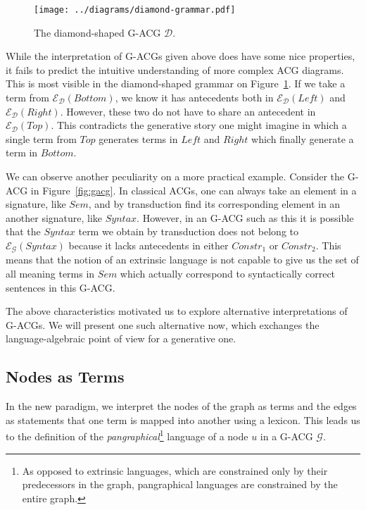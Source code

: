 \documentclass{llncs}
\begin{document}
\begin{figure}
  \centering
  \texttt{[image: ../diagrams/diamond-grammar.pdf]}
  \caption{\label{fig:diamond} The diamond-shaped G-ACG $\mathcal{D}$.}
\end{figure}

While the interpretation of G-ACGs given above does have some nice properties,
it fails to predict the intuitive understanding of more complex ACG
diagrams. This is most visible in the diamond-shaped grammar on
Figure~\ref{fig:diamond}. If we take a term from
$\mathcal{E}_{\mathcal{D}}(Bottom)$, we know it has antecedents both in
$\mathcal{E}_{\mathcal{D}}(Left)$ and
$\mathcal{E}_{\mathcal{D}}(Right)$. However, these two do not have to share an
antecedent in $\mathcal{E}_{\mathcal{D}}(Top)$. This contradicts the
generative story one might imagine in which a single term from $Top$ generates
terms in $Left$ and $Right$ which finally generate a term in $Bottom$.

We can observe another peculiarity on a more practical example. Consider the
G-ACG in Figure~\ref{fig:gacg}. In classical ACGs, one can always take an
element in a signature, like $Sem$, and by transduction find its corresponding
element in an another signature, like $Syntax$. However, in an G-ACG such as
this it is possible that the $Syntax$ term we obtain by transduction does not
belong to $\mathcal{E}_{\mathcal{G}}(Syntax)$ because it lacks antecedents in
either $Constr_1$ or $Constr_2$. This means that the notion of an extrinsic
language is not capable to give us the set of all meaning terms in $Sem$ which
actually correspond to syntactically correct sentences in this G-ACG.

The above characteristics motivated us to explore alternative interpretations
of G-ACGs. We will present one such alternative now, which exchanges the
language-algebraic point of view for a generative one.

\subsection{Nodes as Terms}

In the new paradigm, we interpret the nodes of the graph as terms and the
edges as statements that one term is mapped into another using a lexicon. This
leads us to the definition of the \emph{pangraphical}\footnote{As opposed to
  extrinsic languages, which are constrained only by their predecessors in the
  graph, pangraphical languages are constrained by the entire graph.} language
of a node $u$ in a G-ACG $\mathcal{G}$.
\end{document}

